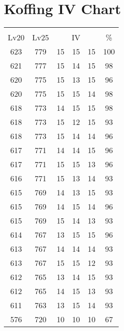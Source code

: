 \documentclass{article}%
\begin{document}
%
\normalsize%
\section{Koffing IV Chart}%
\label{sec:Koffing IV Chart}%
\renewcommand{\arraystretch}{1.5}%
\begin{tabular}{|c|c|c|c|c|c|}%
\hline%
\multicolumn{6}{|c|}{\textcolor{white}{ 
\linebreak{Koffing}
}%
\cellcolor{black}}\\%
\multicolumn{1}{|c}{Lv20}&\multicolumn{1}{c|}{Lv25}&\multicolumn{3}{c|}{IV}&\multicolumn{1}{|c|}{\%}\\%
\hline%
\rowcolor{color100}%
623&779&15&15&15&100\\%
\hline%
\rowcolor{color98}%
621&777&15&14&15&98\\%
\hline%
\rowcolor{color96}%
620&775&15&13&15&96\\%
\hline%
\rowcolor{color98}%
620&775&15&15&14&98\\%
\hline%
\rowcolor{color98}%
618&773&14&15&15&98\\%
\hline%
\rowcolor{color93}%
618&773&15&12&15&93\\%
\hline%
\rowcolor{color96}%
618&773&15&14&14&96\\%
\hline%
\rowcolor{color96}%
617&771&14&14&15&96\\%
\hline%
\rowcolor{color96}%
617&771&15&15&13&96\\%
\hline%
\rowcolor{color93}%
616&771&15&13&14&93\\%
\hline%
\rowcolor{color93}%
615&769&14&13&15&93\\%
\hline%
\rowcolor{color96}%
615&769&14&15&14&96\\%
\hline%
\rowcolor{color93}%
615&769&15&14&13&93\\%
\hline%
\rowcolor{color96}%
614&767&13&15&15&96\\%
\hline%
\rowcolor{color93}%
613&767&14&14&14&93\\%
\hline%
\rowcolor{color93}%
613&767&15&15&12&93\\%
\hline%
\rowcolor{color93}%
612&765&13&14&15&93\\%
\hline%
\rowcolor{color93}%
612&765&14&15&13&93\\%
\hline%
\rowcolor{color93}%
611&763&13&15&14&93\\%
\hline%
\rowcolor{color91}%
576&720&10&10&10&67\\%
\end{tabular}

%
\end{document}
